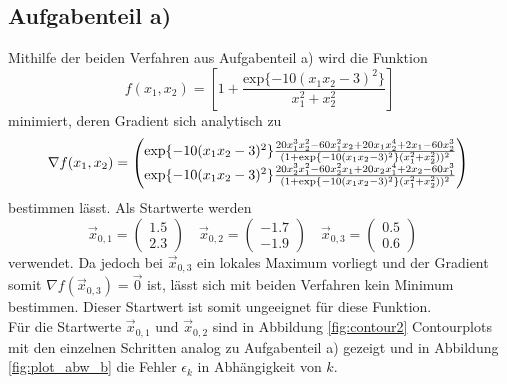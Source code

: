 \subsection*{Aufgabenteil a)}
Mithilfe der beiden Verfahren aus Aufgabenteil a) wird die Funktion
\begin{equation}
  f(x_1,x_2)=\left[1+\frac{\text{exp}\{-10(x_1x_2-3)^2\}}{x_1^2+x_2^2}   \right]
  \label{eqn:b}
\end{equation}
minimiert, deren Gradient sich analytisch zu
\begin{equation}
  \nabla f(x_1,x_2)=
  \begin{pmatrix}
    \text{exp}\{-10(x_1 x_2-3)^2\}\frac{20x_1^3 x_2^2-60x_1^2 x_2+20 x_1 x_2^4+2x_1-60x_2^3}{(1+\text{exp}\{-10(x_1x_2-3)^2\}(x_1^2+x_2^2))^2} \\
    \text{exp}\{-10(x_1x_2-3)^2\}\frac{20x_2^3x_1^2-60x_2^2x_1+20x_2 x_1^4+2x_2-60x_1^3}{(1+\text{exp}\{-10(x_1x_2-3)^2\}(x_1^2+x_2^2))^2}
  \end{pmatrix} \\
\end{equation}
bestimmen lässt.
Als Startwerte werden
\begin{equation}
  \vec{x}_{0,1}=
  \begin{pmatrix}
    1.5 \\
    2.3
  \end{pmatrix} \quad
  \vec{x}_{0,2}=
  \begin{pmatrix}
    -1.7 \\
    -1.9
  \end{pmatrix} \quad
  \vec{x}_{0,3}=
  \begin{pmatrix}
    0.5 \\
    0.6
  \end{pmatrix} \quad
\end{equation}
verwendet. Da jedoch bei $\vec{x}_{0,3}$ ein lokales Maximum vorliegt und der Gradient somit $\nabla f(\vec{x}_{0,3})=\vec{0}$ ist, lässt sich mit beiden Verfahren kein Minimum bestimmen. Dieser Startwert ist somit ungeeignet für diese Funktion. \\
Für die Startwerte $\vec{x}_{0,1}$ und $\vec{x}_{0,2}$ sind in Abbildung \ref{fig:contour2} Contourplots mit den einzelnen Schritten analog zu Aufgabenteil a) gezeigt und in Abbildung \ref{fig:plot_abw_b} die Fehler $\epsilon_k$ in Abhängigkeit von $k$.
